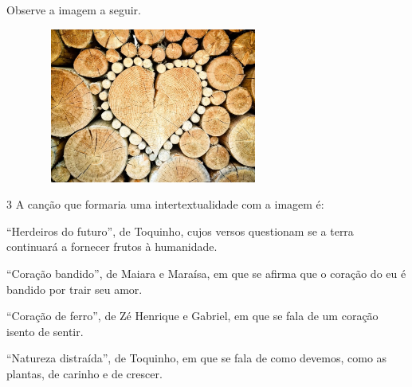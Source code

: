 

Observe a imagem a seguir.

\begin{figure}[H]
\centering\includegraphics[width=3in,height=2in]{./imgSAEB_6_POR/media/image14.jpeg}
\end{figure}

\num{3} A canção que formaria uma intertextualidade com a imagem é:

\begin{escolha}
\item ``Herdeiros do futuro'', de Toquinho, cujos versos questionam se a
terra continuará a fornecer frutos à humanidade.
\item ``Coração bandido'', de Maiara e Maraísa, em que se afirma que o
coração do eu é bandido por trair seu amor.
\item ``Coração de ferro'', de Zé Henrique e Gabriel, em que se fala de um
coração isento de sentir.
\item ``Natureza distraída'', de Toquinho, em que se fala de como devemos,
como as plantas, de carinho e de crescer.
\end{escolha}

